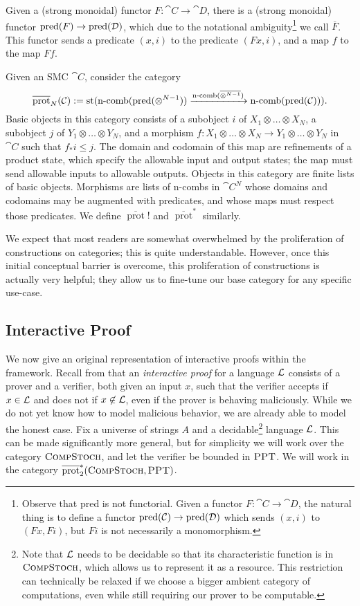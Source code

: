 Given a (strong monoidal) functor $F: \cat{C}\to\cat{D}$, there is a (strong
monoidal) functor $\operatorname{pred}(F)\to\operatorname{pred}({\mathcal{D}})$, which due to the notational
ambiguity\footnote{ Observe that pred is not functorial. Given a functor $F:
  \cat{C}\to\cat{D}$, the natural thing is to define a functor
  $\operatorname{pred}({\mathcal{C}})\to\operatorname{pred}({\mathcal{D}})$ which sends $(x, i)$ to $(Fx, Fi)$, but $Fi$
is not necessarily a monomorphism. } we call $\overline{F}$. This functor sends
a predicate $(x, i)$ to the predicate $(Fx, i)$, and a map $f$ to the map $Ff$.

Given an SMC $\cat{C}$, consider the category \[
  \overline{\operatorname{prot}}_{N}({\mathcal{C}}) := \operatorname*{st}(\operatorname*{n-comb}(\operatorname{pred}(\otimes^{N-1}))\xrightarrow{\operatorname*{n-comb}(\overline{\otimes^{N-1}})}\operatorname*{n-comb}(\operatorname{pred}({\mathcal{C}}))).
\]
Basic objects in this category consists of a subobject $i$ of $X_1\otimes \dots\otimes
X_N$, a subobject $j$ of $Y_1\otimes \dots\otimes Y_N$, and a morphism
$f: X_1\otimes\dots\otimes X_N\to Y_1\otimes\dots\otimes Y_N$ in $\cat{C}$ such
that $f_*i\leq j$. The domain and codomain of this map are refinements of a
product state, which specify the allowable input and output states; the map must
send allowable inputs to allowable outputs. Objects in this category are finite
lists of basic objects. Morphisms are lists of n-combs in $\cat{C}^N$ whose
domains and codomains may be augmented with predicates, and whose maps must
respect those predicates. We define $\overline{\operatorname{prot}}!$ and
$\overline{\operatorname{prot}}^*$ similarly.

We expect that most readers are somewhat overwhelmed by the
proliferation of constructions on categories; this is quite understandable.
However, once this initial conceptual barrier is overcome, this proliferation of
constructions is actually very helpful; they allow us to fine-tune our base
category for any specific use-case.

\subsection{Interactive Proof}

We now give an original representation of interactive proofs within the
framework. Recall from 
that an \emph{interactive proof} for a
language $\mathcal{L}$ consists of a prover and a verifier, both given an input $x$,
such that the verifier accepts if $x\in\mathcal{L}$ and does not if $x\not\in\mathcal{L}$, even
if the prover is behaving maliciously. While we do not yet know how to model
malicious behavior, we are already able to model the honest case. Fix a universe
of strings $A$ and a decidable\footnote{
  Note that $\mathcal{L}$ needs to be decidable so that its characteristic function is
  in ${\textsc{\text{CompStoch}}}$, which allows us to represent it as a resource. This
  restriction can technically be relaxed if we choose a bigger ambient category
  of computations, even while still requiring our prover to be computable.
} language $\mathcal{L}$. This can be made significantly more
general, but for simplicity we will work over the category ${\textsc{\text{CompStoch}}}$,
and let the verifier be bounded in ${\textsc{\text{PPT}}}$. We will work in the category
$\overline{\operatorname{prot}}^*_{2}({\textsc{\text{CompStoch}}}, {\textsc{\text{PPT}}})$.

